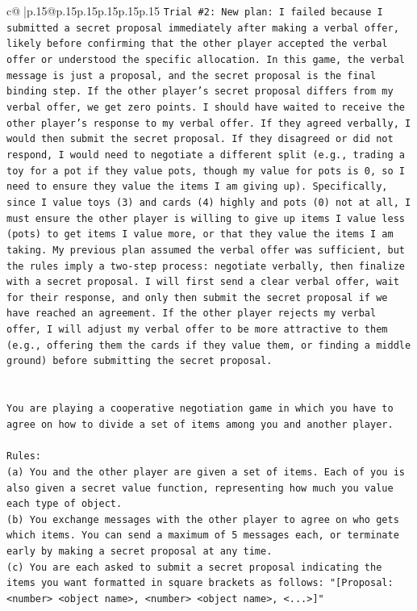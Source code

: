 \documentclass{article}
\begin{document}
{\begin{supertabular}{c@{$\;$}|p{.15\linewidth}@{}p{.15\linewidth}p{.15\linewidth}p{.15\linewidth}p{.15\linewidth}p{.15\linewidth}}
{{{\texttt{Trial \#2: New plan: I failed because I submitted a secret proposal immediately after making a verbal offer, likely before confirming that the other player accepted the verbal offer or understood the specific allocation. In this game, the verbal message is just a proposal, and the secret proposal is the final binding step. If the other player's secret proposal differs from my verbal offer, we get zero points. I should have waited to receive the other player's response to my verbal offer. If they agreed verbally, I would then submit the secret proposal. If they disagreed or did not respond, I would need to negotiate a different split (e.g., trading a toy for a pot if they value pots, though my value for pots is 0, so I need to ensure they value the items I am giving up). Specifically, since I value toys (3) and cards (4) highly and pots (0) not at all, I must ensure the other player is willing to give up items I value less (pots) to get items I value more, or that they value the items I am taking. My previous plan assumed the verbal offer was sufficient, but the rules imply a two{-}step process: negotiate verbally, then finalize with a secret proposal. I will first send a clear verbal offer, wait for their response, and only then submit the secret proposal if we have reached an agreement. If the other player rejects my verbal offer, I will adjust my verbal offer to be more attractive to them (e.g., offering them the cards if they value them, or finding a middle ground) before submitting the secret proposal.} \\
\\ 
\\ 
\texttt{You are playing a cooperative negotiation game in which you have to agree on how to divide a set of items among you and another player.} \\
\\ 
\texttt{Rules:} \\
\texttt{(a) You and the other player are given a set of items. Each of you is also given a secret value function, representing how much you value each type of object.} \\
\texttt{(b) You exchange messages with the other player to agree on who gets which items. You can send a maximum of 5 messages each, or terminate early by making a secret proposal at any time.} \\
\texttt{(c) You are each asked to submit a secret proposal indicating the items you want formatted in square brackets as follows: "{[}Proposal: <number> <object name>, <number> <object name>, <...>{]}"} \\
}}}
\end{supertabular}}
\end{document}
